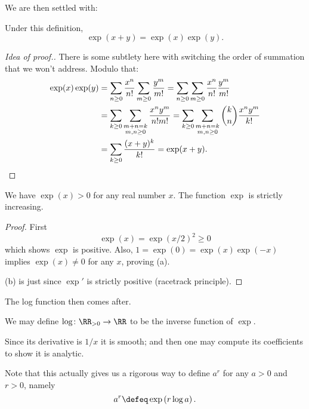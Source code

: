 We are then settled with:
\begin{proposition}
	Under this definition,
	\[ \exp(x+y) = \exp(x) \exp(y). \]
\end{proposition}
\begin{proof}
	[Idea of proof.]
	There is some subtlety here with switching
	the order of summation that we won't address.
	Modulo that:
	\begin{align*}
		\exp(x) \exp(y)
		&= \sum_{n \ge 0} \frac{x^n}{n!}
			\sum_{m \ge 0} \frac{y^m}{m!}
		= \sum_{n \ge 0} \sum_{m \ge 0}
			\frac{x^n}{n!} \frac{y^m}{m!} \\
		&= \sum_{k \ge 0} \sum_{\substack{m+n = k \\ m,n \ge 0}}
			\frac{x^n y^m}{n! m!}
		= \sum_{k \ge 0} \sum_{\substack{m+n = k \\ m,n \ge 0}}
			\binom{k}{n} \frac{x^n y^m}{k!} \\
		&= \sum_{k \ge 0} \frac{(x+y)^k}{k!} = \exp(x+y). \qedhere
	\end{align*}
\end{proof}

\begin{corollary}
	\listhack
	\begin{enumerate}[(a)]
		\ii We have $\exp(x) > 0$ for any real number $x$.
		\ii The function $\exp$ is strictly increasing.
	\end{enumerate}
\end{corollary}
\begin{proof}
	First \[ \exp(x) = \exp(x/2)^2 \ge 0 \]
	which shows $\exp$ is positive.
	Also, $1 = \exp(0) = \exp(x) \exp(-x)$ implies $\exp(x) \ne 0$
	for any $x$, proving (a).

	(b) is just since $\exp'$ is strictly positive (racetrack principle).
\end{proof}

The log function then comes after.
\begin{definition}
	We may define $\log \colon \RR_{>0} \to \RR$
	to be the inverse function of $\exp$.
\end{definition}
Since its derivative is $1/x$ it is smooth;
and then one may compute its coefficients to show it is analytic.
	
Note that this actually gives us a rigorous way to define
$a^r$ for any $a > 0$ and $r > 0$, namely
\[ a^r \defeq \exp\left( r \log a \right). \]

